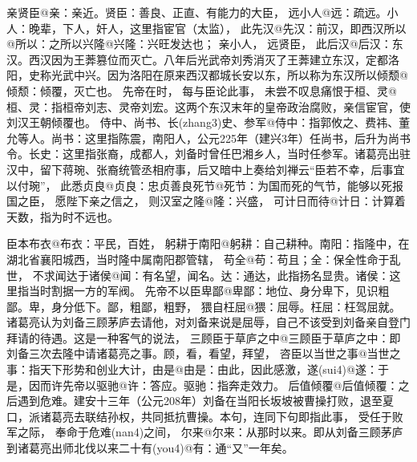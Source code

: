 \documentclass[a4paper]{article}
\newcommand{\comment}[1]{{\noindent\kaiti\large #1}}
\begin{document}

亲贤臣@{亲：亲近。贤臣：善良、正直、有能力的大臣}，
远小人@{远：疏远。小人：晚辈，下人，奸人，这里指宦官（太监）}，
此先汉@{先汉：前汉，即西汉}所以@{所以：之所以}兴隆@{兴隆：兴旺发达}也；
亲小人，
远贤臣，
此后汉@{后汉：东汉。西汉因为王莾篡位而灭亡。八年后光武帝刘秀消灭了王莾建立东汉，定都洛阳，史称光武中兴。因为洛阳在原来西汉都城长安以东，所以称为东汉}所以倾颓@{倾颓：倾覆，灭亡}也。
先帝在时，
每与臣论此事，
未尝不叹息痛恨于桓、灵@{桓、灵：指桓帝刘志、灵帝刘宏。这两个东汉末年的皇帝政治腐败，亲信宦官，使刘汉王朝倾覆}也。
侍中、尚书、长(zhang3)史、参军@{侍中：指郭攸之、费祎、董允等人。尚书：这里指陈震，南阳人，公元225年（建兴3年）任尚书，后升为尚书令。长史：这里指张裔，成都人，刘备时曾任巴湘乡人，当时任参军。诸葛亮出驻汉中，留下蒋琬、张裔统管丞相府事，后又暗中上奏给刘禅云“臣若不幸，后事宜以付琬”}，
此悉贞良@{贞良：忠贞善良}死节@{死节：为国而死的气节，能够以死报国}之臣，
愿陛下亲之信之，
则汉室之隆@{隆：兴盛}，
可计日而待@{计日：计算着天数，指为时不远}也。


臣本布衣@{布衣：平民，百姓}，
躬耕于南阳@{躬耕：自己耕种。南阳：指隆中，在湖北省襄阳城西，当时隆中属南阳郡管辖}，
苟全@{苟：苟且；全：保全}性命于乱世，
不求闻达于诸侯@{闻：有名望，闻名。达：通达，此指扬名显贵。诸侯：这里指当时割据一方的军阀}。
先帝不以臣卑鄙@{卑鄙：地位、身分卑下，见识粗鄙。卑，身分低下。鄙，粗鄙，粗野}，
猥自枉屈@{猥：屈辱。枉屈：枉驾屈就。诸葛亮认为刘备三顾茅庐去请他，对刘备来说是屈辱，自己不该受到刘备亲自登门拜请的待遇。这是一种客气的说法}，
三顾臣于草庐之中@{三顾臣于草庐之中：即刘备三次去隆中请诸葛亮之事。顾，看，看望，拜望}，
咨臣以当世之事@{当世之事：指天下形势和创业大计}，由是@{由是：由此，因此}感激，遂(sui4)@{遂：于是，因而}许先帝以驱驰@{许：答应。驱驰：指奔走效力}。
后值倾覆@{后值倾覆：之后遇到危难。建安十三年（公元208年）刘备在当阳长坂坡被曹操打败，退至夏口，派诸葛亮去联结孙权，共同抵抗曹操。本句，连同下句即指此事}，
受任于败军之际，
奉命于危难(nan4)之间，
尔来@{尔来：从那时以来。即从刘备三顾茅庐到诸葛亮出师北伐以来}二十有(you4)@{有：通“又”}一年矣。

\end{document}
